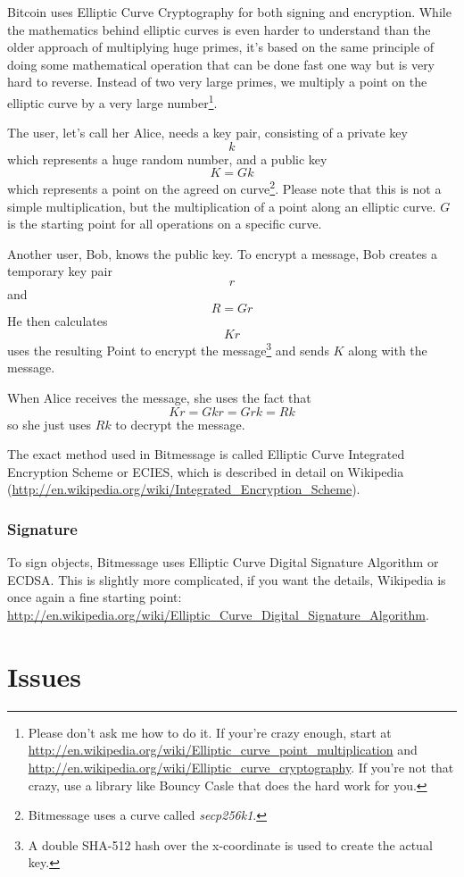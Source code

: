 \documentclass{bfh}
\begin{document}
  Bitcoin uses Elliptic Curve Cryptography for both signing and encryption. While the mathematics behind elliptic curves is even harder to understand than the older approach of multiplying huge primes, it's based on the same principle of doing some mathematical operation that can be done fast one way but is very hard to reverse. Instead of two very large primes, we multiply a point on the elliptic curve by a very large number\footnote{Please don't ask me how to do it. If your're crazy enough, start at \url{http://en.wikipedia.org/wiki/Elliptic_curve_point_multiplication} and \url{http://en.wikipedia.org/wiki/Elliptic_curve_cryptography}. If you're not that crazy, use a library like Bouncy Casle that does the hard work for you.}.

  The user, let's call her Alice, needs a key pair, consisting of a private key
$$k$$
which represents a huge random number, and a public key
$$K = G k$$
which represents a point on the agreed on curve\footnote{Bitmessage uses a curve called \textit{secp256k1}.}. Please note that this is not a simple multiplication, but the multiplication of a point along an elliptic curve. $G$ is the starting point for all operations on a specific curve.

  Another user, Bob, knows the public key. To encrypt a message, Bob creates a temporary key pair
$$r$$
and
$$R = G r$$
He then calculates
$$K r$$
uses the resulting Point to encrypt the message\footnote{A double SHA-512 hash over the x-coordinate is used to create the actual key.} and sends $K$ along with the message.

  When Alice receives the message, she uses the fact that
$$K r = G k r = G r k = R k$$
so she just uses $R k$ to decrypt the message.

  The exact method used in Bitmessage is called Elliptic Curve Integrated Encryption Scheme or ECIES, which is described in detail on Wikipedia (\url{http://en.wikipedia.org/wiki/Integrated_Encryption_Scheme}).

  \subsubsection{Signature}

  To sign objects, Bitmessage uses Elliptic Curve Digital Signature Algorithm or ECDSA. This is slightly more complicated, if you want the details, Wikipedia is once again a fine starting point: \url{http://en.wikipedia.org/wiki/Elliptic_Curve_Digital_Signature_Algorithm}.

  \section{Issues}
\end{document}
